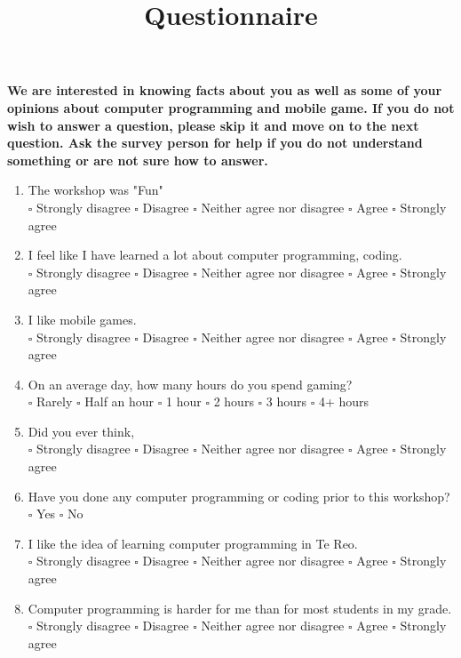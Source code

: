 \documentclass[12pt]{article}\pagestyle{myheadings}
\title{Questionnaire}
\theoremstyle{plain}
\begin{document}
\textbf{We are interested in knowing facts about you as well as some of your opinions about
computer programming and mobile game. If you do not wish to answer a question, please skip it and move on to the next question. Ask the survey person for help if you do not understand something or are not sure how
to answer.}
\begin{enumerate}

\item The workshop was "Fun"\\
$\square$ Strongly disagree $\square$ Disagree $\square$ Neither agree nor disagree $\square$ Agree $\square$ Strongly agree


\item I feel like I have learned a lot about computer programming, coding. \\
$\square$ Strongly disagree $\square$ Disagree $\square$ Neither agree nor disagree $\square$ Agree $\square$ Strongly agree



\item I like mobile games. \\
$\square$ Strongly disagree $\square$ Disagree $\square$ Neither agree nor disagree $\square$ Agree $\square$ Strongly agree

\item On an average day, how many hours do you spend gaming? \\
$\square$ Rarely $\square$ Half an hour	$\square$ 1 hour $\square$ 2 hours $\square$ 3 hours $\square$	4+ hours


\item Did you ever think,  \\
$\square$ Strongly disagree $\square$ Disagree $\square$ Neither agree nor disagree $\square$ Agree $\square$ Strongly agree


\item Have you done any computer programming or coding prior to this workshop? \\
$\square$ Yes $\square$ No

\item I like the idea of learning computer programming in Te Reo.\\
$\square$ Strongly disagree $\square$ Disagree $\square$ Neither agree nor disagree $\square$ Agree $\square$ Strongly agree


\item Computer programming is harder for me than for most students in my grade.\\
$\square$ Strongly disagree $\square$ Disagree $\square$ Neither agree nor disagree $\square$ Agree $\square$ Strongly agree



\end{enumerate}
\end{document}
